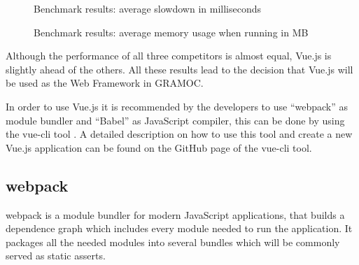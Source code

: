 \begin{figure}[H]
    \centering
    \caption{Benchmark results: average slowdown in milliseconds}
    \label{fig:slowdownresults}
\end{figure}

\begin{figure}[H]
    \centering
    \caption{Benchmark results: average memory usage when running in MB}
    \label{fig:memoryresults}
\end{figure}

Although the performance of all three competitors is almost equal, Vue.js is slightly ahead of the others. All these results lead to the decision that Vue.js will be used as the Web Framework in GRAMOC.

In order to use Vue.js it is recommended by the developers to use ``webpack''  as module bundler and ``Babel'' as JavaScript compiler, this can be done by using the vue-cli tool \cite{webpack, Babel, vuecli}. A detailed description on how to use this tool and create a new Vue.js application can be found on the GitHub page of the vue-cli tool.

\subsection{webpack}
webpack is a module bundler for modern JavaScript applications, that builds a dependence graph which includes every module needed to run the application. It packages all the needed modules into several bundles which will be commonly served as static asserts.


